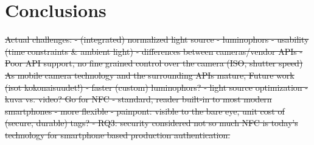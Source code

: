 \documentclass[thesis.tex]{subfiles}
\begin{document}
\chapter{Conclusions}
\label{chapter:conclusions}

\sout{Actual challenges:
- (integrated) normalized light source
- luminophors
- usability (time constraints \& ambient light)
- differences between cameras/vendor APIs
- Poor API support, no fine grained control over the camera (ISO, shutter speed)
As mobile camera technology and the surrounding APIs mature,
Future work (isot kokonaisuudet!)
  - faster (custom) luminophors?
  - light source optimization
  - kuva vs. video?
Go for NFC
- standard, reader built-in to most modern smartphones
- more flexible
- painpont: visible to the bare eye, unit cost of (secure, durable) tags?
- RQ3: security considered not so much
NFC is today's technology for smartphone based production authentication.}
\end{document}
